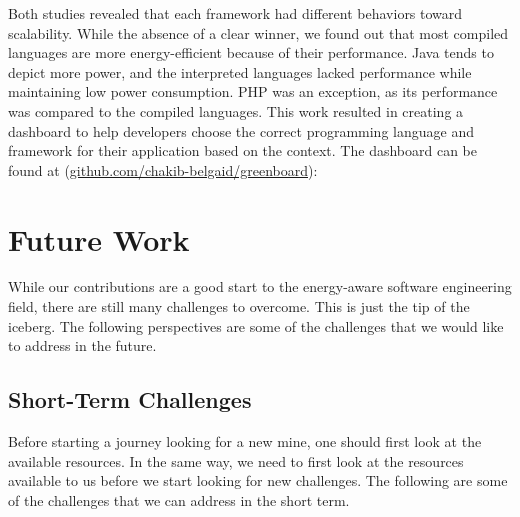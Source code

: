 Both studies revealed that each framework had different behaviors toward scalability.
While the absence of a clear winner, we found out that most compiled languages are more energy-efficient because of their performance. Java tends to depict more power, and the interpreted languages lacked performance while maintaining low power consumption. PHP was an exception, as its performance was compared to the compiled languages. 
This work resulted in creating a dashboard to help developers choose the correct programming language and framework for their application based on the context. The dashboard can be found at (\url{github.com/chakib-belgaid/greenboard}):




\section{Future Work}
While our contributions are a good start to the energy-aware software engineering field, there are still many challenges to overcome.
This is just the tip of the iceberg.
The following perspectives are some of the challenges that we would like to address in the future.

\subsection{Short-Term Challenges}
Before starting a journey looking for a new mine, one should first look at the available resources.
In the same way, we need to first look at the resources available to us before we start looking for new challenges.
The following are some of the challenges that we can address in the short term.

